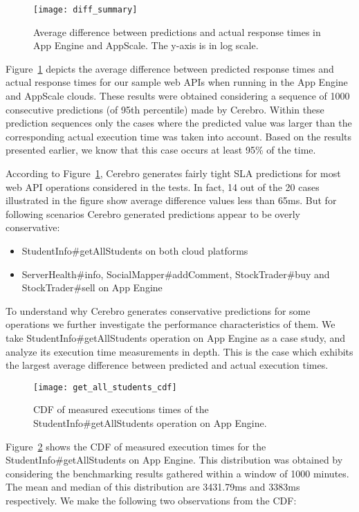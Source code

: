 \begin{figure}
\centering
\texttt{[image: diff\_summary]}
\caption{Average difference between predictions and actual response times in App Engine and AppScale. The y-axis is in log scale.}
\label{fig:diff_summary}
\end{figure}

Figure~\ref{fig:diff_summary} depicts the average difference between predicted response times and actual response times for
our sample web APIs when running in the App Engine and AppScale clouds. 
These results were obtained considering a sequence of 1000 consecutive predictions (of 95th percentile) made by Cerebro. 
Within these prediction sequences only the cases 
where the predicted value was larger than the corresponding actual execution time was taken into account. Based on the results
presented earlier, we know that this case occurs at least 95\% of the time.

According to Figure~\ref{fig:diff_summary}, Cerebro generates fairly tight SLA predictions for most web API operations considered in the tests. In fact,
14 out of the 20 cases illustrated in the figure show average difference values less than 65ms. But for following scenarios Cerebro generated
predictions appear to be overly conservative:

\begin{itemize}
\item StudentInfo\#getAllStudents on both cloud platforms
\item ServerHealth\#info, SocialMapper\#addComment, StockTrader\#buy and StockTrader\#sell on App Engine
\end{itemize}

To understand why Cerebro generates conservative predictions for some operations we further 
investigate the performance characteristics of them. We take StudentInfo\#getAllStudents
operation on App Engine as a case study, and analyze its execution time measurements in depth. 
This is the case which exhibits the largest average difference between predicted and actual execution times.

\begin{figure}
\centering
\texttt{[image: get\_all\_students\_cdf]}
\caption{CDF of measured executions times of the StudentInfo\#getAllStudents operation on App Engine.}
\label{fig:get_all_students_cdf}
\end{figure}

Figure~\ref{fig:get_all_students_cdf} shows the CDF of measured execution times for the StudentInfo\#getAllStudents on
App Engine. This distribution was obtained by considering the benchmarking results gathered within a window of 1000 minutes. 
The mean and median of this distribution are 3431.79ms and 3383ms respectively. We make the following two observations from the
CDF:

